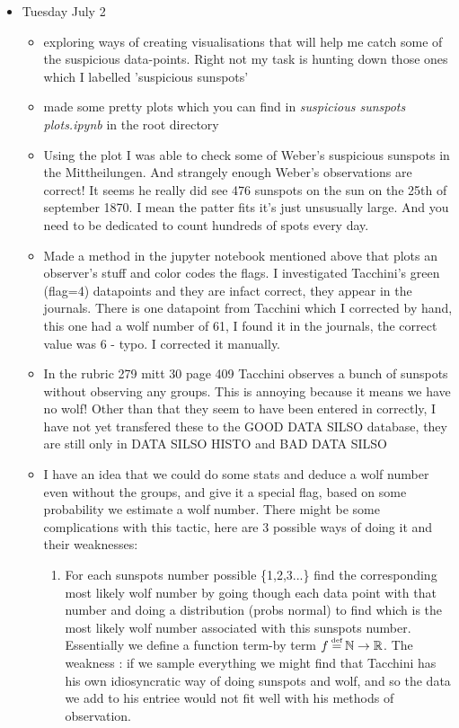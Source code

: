 \documentclass[12pt]{article}
\newcommand{\N}{\mathbb{N}}
\newcommand{\R}{\mathbb{R}}
\newcommand\defeq{\mathrel{\stackrel{\makebox[0pt]{\mbox{\normalfont\tiny def}}}{=}}}
\begin{document}
\begin{itemize}
\item Tuesday July 2
    \begin{itemize}
        \item exploring ways of creating visualisations that will help me catch some of the suspicious data-points. Right not my task is hunting down those ones which I labelled 'suspicious sunspots'
        \item made some pretty plots which you can find in \textit{suspicious sunspots plots.ipynb} in the root directory
        \item Using the plot I was able to check some of Weber's suspicious sunspots in the Mittheilungen. And strangely enough Weber's observations are correct! It seems he really did see 476 sunspots on the sun on the 25th of september 1870. I mean the patter fits it's just unsusually large. And you need to be dedicated to count hundreds of spots every day.
        \item Made a method in the jupyter notebook mentioned above that plots an observer's stuff and color codes the flags. I investigated Tacchini's green (flag=4) datapoints and they are infact correct, they appear in the journals. There is one datapoint from Tacchini which I corrected by hand, this one had a wolf number of 61, I found it in the journals, the correct value was 6 - typo. I corrected it manually.
        \item In the rubric 279 mitt 30 page 409 Tacchini observes a bunch of sunspots without observing any groups. This is annoying because it means we have no wolf! Other than that they seem to have been entered in correctly, I have not yet transfered these to the GOOD DATA SILSO database, they are still only in DATA SILSO HISTO and BAD DATA SILSO
        \item I have an idea that we could do some stats and deduce a wolf number even without the groups, and give it a special flag, based on some probability we estimate a wolf number. There might be some complications with this tactic, here are 3 possible ways of doing it and their weaknesses:
        \begin{enumerate}
            \item For each sunspots number possible \{1,2,3...\} find the corresponding most likely wolf number by going though each data point with that number and doing a distribution (probs normal) to find which is the most likely wolf number associated with this sunspots number. Essentially we define a function term-by term $f \defeq{} \N \to \R$. The weakness : if we sample everything we might find that Tacchini has his own idiosyncratic way of doing sunspots and wolf, and so the data we add to his entriee would not fit well with his methods of observation.

\end{enumerate}
\end{itemize}
\end{itemize}
\end{document}
